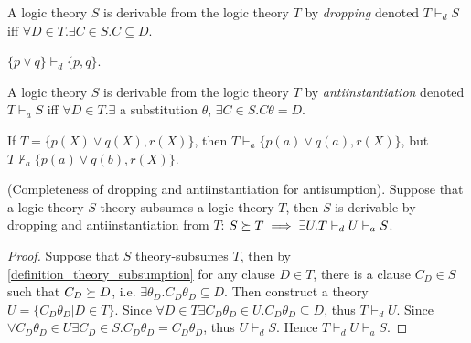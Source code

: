 \begin{defn}
A logic theory $S$ is derivable from the logic theory $T$ by \emph{dropping} denoted $T \vdash_d S$ iff
$\forall D \in T. \exists C \in S. C \subseteq D$.
\end{defn}

\begin{exmp}
$\{p \lor q\} \vdash_d \{p, q\}$.
\end{exmp}

\begin{defn}
A logic theory $S$ is derivable from the logic theory $T$ by \emph{antiinstantiation} denoted $T \vdash_a S$ iff
$\forall D \in T. \exists$ a substitution $\theta$, $\exists C \in S. C\theta = D$.
\end{defn}

\begin{exmp}
If $T=\{p(X) \lor q(X), r(X)\}$, then $T\vdash_a\{p(a) \lor q(a), r(X)\}$,
but $T\not\vdash_a\{p(a) \lor q(b), r(X)\}$.
\end{exmp}

\begin{proposition}(Completeness of dropping and antiinstantiation for antisumption).
Suppose that a logic theory $S$ theory-subsumes a logic theory $T$, then $S$ is derivable by dropping and antiinstantiation from $T$:
$S \succeq T \implies \exists U. T \vdash_d U \vdash_a S$.
\end{proposition}
\begin{proof}
Suppose that $S$ theory-subsumes $T$, then by \ref{definition_theory_subsumption} for any clause $D \in T$, there is a clause $C_D \in S$ such
that $C_D \succeq D$, i.e. $\exists \theta_{D}. C_D \theta_D \subseteq D$.
Then construct a theory $U=\{C_D \theta_D | D \in T \}$.
Since $\forall D \in T \exists C_D \theta_D \in U. C_D \theta_D \subseteq D$, thus $T \vdash_d U$.
Since $\forall C_D \theta_D \in U \exists C_D \in S. C_D \theta_D=C_D \theta_D$, thus $U \vdash_d S$. Hence $T \vdash_d U \vdash_a S$.
\end{proof}